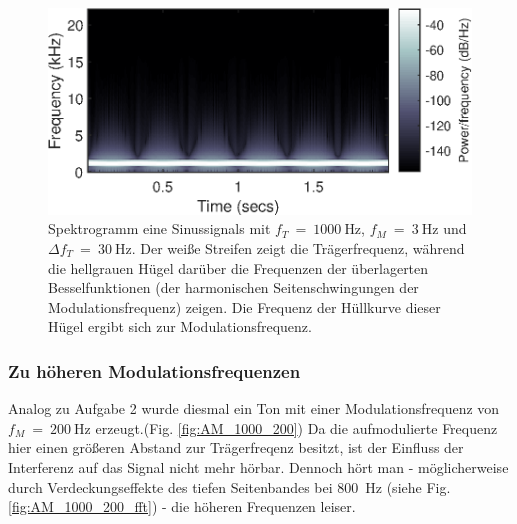 \begin{figure}[h]
    \centering
    \includegraphics[width=.9\linewidth]{ue4/FM_1000_3_spect.eps}
    \caption{Spektrogramm eine Sinussignals mit $f_T\ =\ \SI{1000}{\Hz}$, $f_M\ =\ \SI{3}{\Hz}$ und $\Delta f_T\ =\  \SI{30}{\Hz}$. Der weiße Streifen zeigt die Trägerfrequenz, während die hellgrauen Hügel darüber die Frequenzen der überlagerten Besselfunktionen (der harmonischen Seitenschwingungen der Modulationsfrequenz) zeigen. Die Frequenz der Hüllkurve dieser Hügel ergibt sich zur Modulationsfrequenz.}
    \label{fig:FM_spectrogram}
\end{figure}

\clearpage

\subsubsection{Zu höheren Modulationsfrequenzen}
Analog zu Aufgabe 2 wurde diesmal ein Ton mit einer Modulationsfrequenz von $f_M\ =\ \SI{200}{\Hz}$ erzeugt.(Fig. \ref{fig:AM_1000_200}) Da die aufmodulierte Frequenz hier einen größeren Abstand zur Trägerfreqenz besitzt, ist der Einfluss der Interferenz auf das Signal nicht mehr hörbar. Dennoch hört man - möglicherweise durch Verdeckungseffekte des tiefen Seitenbandes bei \SI{800}{\Hz} (siehe Fig. \ref{fig:AM_1000_200_fft})  - die höheren Frequenzen leiser.


